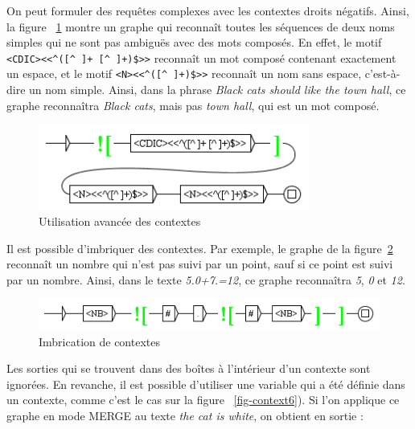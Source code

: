 \bigskip
\noindent On peut formuler des requêtes complexes avec les contextes droits négatifs. Ainsi, la figure
~\ref{fig-context4} montre un graphe qui reconnaît toutes les séquences de deux noms simples qui ne
sont pas ambiguës avec des mots composés. En effet, le motif \verb?<CDIC><<^([^ ]+ [^ ]+)$>>? 
reconnaît un mot composé contenant exactement un espace, et le motif \verb?<N><<^([^ ]+)$>>?
reconnaît un nom sans espace, c’est-à-dire un nom simple. Ainsi,
 dans la phrase \textit{Black cats should like the town hall}, ce graphe reconnaîtra
 \textit{Black cats}, mais pas \textit{town hall}, qui est un mot composé.

\bigskip
\begin{figure}[!h]
\begin{center}
\includegraphics[width=8.9cm]{resources/img/fig6-15.png}
\caption{Utilisation avancée des contextes\label{fig-context4}}
\end{center}
\end{figure}

\bigskip
\noindent Il est possible d’imbriquer des contextes. Par exemple, le graphe de la
figure~\ref{fig-context5}
reconnaît un nombre qui n’est pas suivi par un point, sauf si ce point est suivi par un nombre.
Ainsi, dans le texte \textit{5.0+7.=12}, ce graphe reconnaîtra \textit{5}, \textit{0} et
\textit{12}.

\bigskip
\begin{figure}[!h]
\begin{center}
\includegraphics[width=12cm]{resources/img/fig6-16.png}
\caption{Imbrication de contextes\label{fig-context5}}
\end{center}
\end{figure}

\bigskip
\noindent Les sorties qui se trouvent dans des boîtes à l’intérieur d’un contexte sont ignorées.
En revanche, il est possible d’utiliser une variable qui a été définie dans un contexte, comme
c’est le cas sur la figure ~\ref{fig-context6}). Si l’on applique ce graphe en mode MERGE au texte
\textit{the cat is white}, on obtient en sortie :

